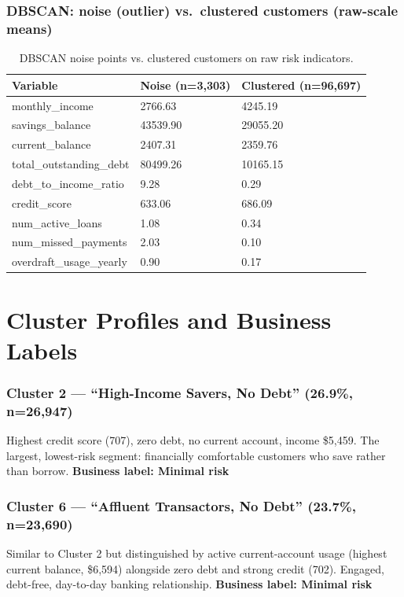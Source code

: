 \documentclass[11pt]{article}
\begin{document}
\subsubsection*{DBSCAN: noise (outlier) vs.\ clustered customers (raw-scale means)}
\begin{table}[h]
\centering
\small
\begin{tabular}{L{4.2cm} C{3.2cm} C{3.2cm}}
\toprule
\textbf{Variable} & \textbf{Noise (n=3,303)} & \textbf{Clustered (n=96,697)} \\
\midrule
monthly\_income          & 2766.63 & 4245.19 \\
savings\_balance         & 43539.90 & 29055.20 \\
current\_balance         & 2407.31 & 2359.76 \\
total\_outstanding\_debt & 80499.26 & 10165.15 \\
debt\_to\_income\_ratio  & 9.28 & 0.29 \\
credit\_score            & 633.06 & 686.09 \\
num\_active\_loans       & 1.08 & 0.34 \\
num\_missed\_payments    & 2.03 & 0.10 \\
overdraft\_usage\_yearly & 0.90 & 0.17 \\
\bottomrule
\end{tabular}
\caption{DBSCAN noise points vs. clustered customers on raw risk indicators.}
\end{table}

\clearpage
\section{Cluster Profiles and Business Labels}
\label{sec:profiles}

\subsubsection*{Cluster 2 --- ``High-Income Savers, No Debt'' (26.9\%, n=26,947)}
Highest credit score (707), zero debt, no current account, income \$5{,}459. The largest, lowest-risk segment: financially comfortable customers who save rather than borrow. \textbf{Business label: Minimal risk}

\subsubsection*{Cluster 6 --- ``Affluent Transactors, No Debt'' (23.7\%, n=23,690)}
Similar to Cluster 2 but distinguished by active current-account usage (highest current balance, \$6{,}594) alongside zero debt and strong credit (702). Engaged, debt-free, day-to-day banking relationship. \textbf{Business label: Minimal risk}
\end{document}
